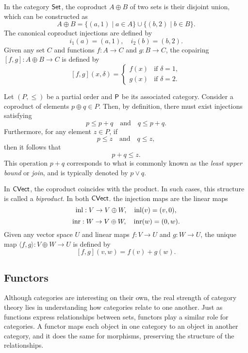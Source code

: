 \begin{example}
  In the category $\mathsf{Set}$, the coproduct \( A \oplus B \) of two sets is their disjoint union, which can be constructed as
\[
A \oplus B = \{(a, 1) \mid a \in A\} \cup \{(b, 2) \mid b \in B\}.
\]
The canonical coproduct injections are defined by
\[
i_1(a) = (a, 1), \quad i_2(b) = (b, 2).
\]
Given any set \(C\) and functions \(f: A \to C\) and \(g: B \to C\), the copairing \([f, g]: A \oplus B \to C\) is defined by
\[
[f, g](x, \delta) = 
\begin{cases}
f(x) & \text{if } \delta = 1, \\
g(x) & \text{if } \delta = 2.
\end{cases}
\]
\end{example}

\begin{example}
  Let $(P, \leq)$ be a partial order and $\mathsf{P}$ be its associated category.  
Consider a coproduct of elements \( p \oplus q \in P \). Then, by definition, there must exist injections satisfying
\[
p \leq p + q \quad \text{and} \quad q \leq p + q.
\]
Furthermore, for any element \( z \in P \), if
\[
p \leq z \quad \text{and} \quad q \leq z,
\]
then it follows that
\[
p + q \leq z.
\]
This operation \( p + q \) corresponds to what is commonly known as the \emph{least upper bound} or \emph{join}, and is typically denoted by \( p \vee q \).
\end{example}


\begin{example}
  In $\mathsf{CVect}$, the coproduct coincides with the product. In such cases, this structure is called a \emph{biproduct}. 
  In both  $\mathsf{CVect}$. the injection maps are the linear maps
\[
\mathrm{inl}: V \to  V \oplus W, \quad  \mathrm{inl}(v)= (v,0),
\]
\[
\mathrm{inr} : W \to V \oplus W, \quad \mathrm{inr}(w) = (0,w).
\]
Given any vector space $U$ and linear maps $f: V \to U$ and $g: W \to U$, the unique map $\langle f, g\rangle : V \oplus W \to U$
is defined by
\[
[f, g] (v,w) = f(v)+ g(w).
\]
\end{example}



\subsection{Functors}
  

Although categories are interesting on their own, the real strength of category theory lies in understanding how categories relate to one another. Just as functions express relationships between sets, functors play a similar role for categories. A functor maps each object in one category to an object in another category, and it does the same for morphisms, preserving the structure of the relationships.


